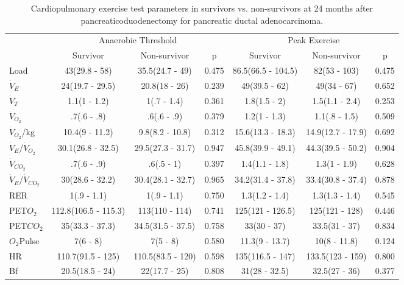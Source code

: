 \begin{sidewaystable}[p]
	\centering
	\caption{Cardiopulmonary exercise test parameters in survivors vs. non-survivors at 24 months after pancreaticoduodenectomy for pancreatic ductal adenocarcinoma. }
	\label{table:cpet_survival_24months}
	\renewcommand{\arraystretch}{1.2} %
	\begin{tabular}{l | c c c | c c c}
		                             &     \multicolumn{3}{c}{Anaerobic Threshold}      &       \multicolumn{3}{c}{Peak Exercise}        \\
		                             & Survivor             & Non-survivor      & p     & Survivor           & Non-survivor      & p     \\ \hline
		Load                         & 43(29.8 - 58)        & 35.5(24.7 - 49)   & 0.475 & 86.5(66.5 - 104.5) & 82(53 - 103)      & 0.475 \\
		$\dot{V}_E$                  & 24(19.7 - 29.5)      & 20.8(18 - 26)     & 0.239 & 49(39.5 - 62)      & 49(34 - 67)       & 0.652 \\
		$\dot{V}_T$                  & 1.1(1 - 1.2)         & 1(.7 - 1.4)       & 0.361 & 1.8(1.5 - 2)       & 1.5(1.1 - 2.4)    & 0.253 \\
		$\dot{V}_{O_2}$              & .7(.6 - .8)          & .6(.6 - .9)       & 0.379 & 1.2(1 - 1.3)       & 1.1(.8 - 1.5)     & 0.509 \\
		$\dot{V}_{O_2}$/kg           & 10.4(9 - 11.2)       & 9.8(8.2 - 10.8)   & 0.312 & 15.6(13.3 - 18.3)  & 14.9(12.7 - 17.9) & 0.692 \\
		$\dot{V}_E$/$\dot{V}_{O_2}$  & 30.1(26.8 - 32.5)    & 29.5(27.3 - 31.7) & 0.947 & 45.8(39.9 - 49.1)  & 44.3(39.5 - 50.2) & 0.904 \\
		$\dot{V}_{CO_2}$             & .7(.6 - .9)          & .6(.5 - 1)        & 0.397 & 1.4(1.1 - 1.8)     & 1.3(1 - 1.9)      & 0.628 \\
		$\dot{V}_E$/$\dot{V}_{CO_2}$ & 30(28.6 - 32.2)      & 30.4(28.1 - 32.7) & 0.965 & 34.2(31.4 - 37.8)  & 33.4(30.8 - 37.4) & 0.878 \\
		RER                          & 1(.9 - 1.1)          & 1(.9 - 1.1)       & 0.750 & 1.3(1.2 - 1.4)     & 1.3(1.3 - 1.4)    & 0.545 \\
		PET$O_2$                     & 112.8(106.5 - 115.3) & 113(110 - 114)    & 0.741 & 125(121 - 126.5)   & 125(121 - 128)    & 0.446 \\
		PET$CO_2$                    & 35(33.3 - 37.3)      & 34.5(31.5 - 37.5) & 0.758 & 33(30 - 37)        & 33.5(31 - 37)     & 0.834 \\
		$O_2$Pulse                   & 7(6 - 8)             & 7(5 - 8)          & 0.580 & 11.3(9 - 13.7)     & 10(8 - 11.8)      & 0.124 \\
		HR                   & 110.7(91.5 - 125)    & 110.5(83.5 - 120) & 0.598 & 135(116.5 - 147)   & 133.5(123 - 159)  & 0.800 \\
		Bf             & 20.5(18.5 - 24)      & 22(17.7 - 25)     & 0.808 & 31(28 - 32.5)      & 32.5(27 - 36)     & 0.377\\ \hline
	\end{tabular}
	

\end{sidewaystable}
